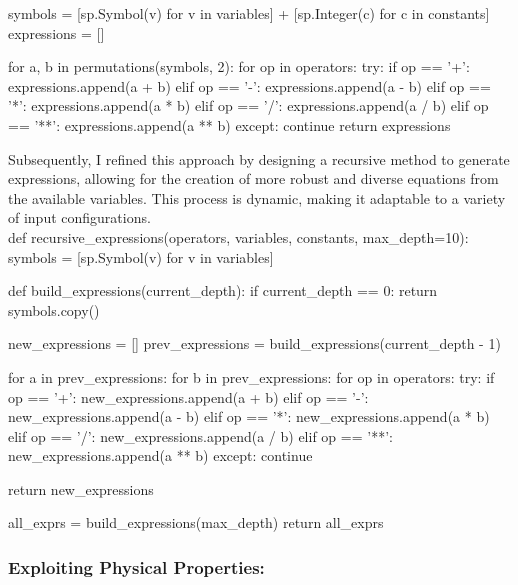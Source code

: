 \documentclass{article}
\begin{document}
    symbols = [sp.Symbol(v) for v in variables] + [sp.Integer(c) for c in constants]
    expressions = []
    
    for a, b in permutations(symbols, 2):
        for op in operators:
            try:
                if op == '+':
                    expressions.append(a + b)
                elif op == '-':
                    expressions.append(a - b)
                elif op == '*':
                    expressions.append(a * b)
                elif op == '/':
                    expressions.append(a / b)
                elif op == '**':
                    expressions.append(a ** b)
            except:
                continue
    return expressions


Subsequently, I refined this approach by designing a recursive method to generate expressions, allowing for the creation of more robust and diverse equations from the available variables. This process is dynamic, making it adaptable to a variety of input configurations.\\

def recursive_expressions(operators, variables, constants, max_depth=10):
    symbols = [sp.Symbol(v) for v in variables]

    def build_expressions(current_depth):
        if current_depth == 0:
            return symbols.copy()

        new_expressions = []
        prev_expressions = build_expressions(current_depth - 1)

        for a in prev_expressions:
            for b in prev_expressions:
                for op in operators:
                    try:
                        if op == '+':
                            new_expressions.append(a + b)
                        elif op == '-':
                            new_expressions.append(a - b)
                        elif op == '*':
                            new_expressions.append(a * b)
                        elif op == '/':
                            new_expressions.append(a / b)
                        elif op == '**':
                            new_expressions.append(a ** b)
                    except:
                        continue

        return new_expressions

    all_exprs = build_expressions(max_depth)
    return all_exprs


\subsubsection{ Exploiting Physical Properties: }
\end{document}
